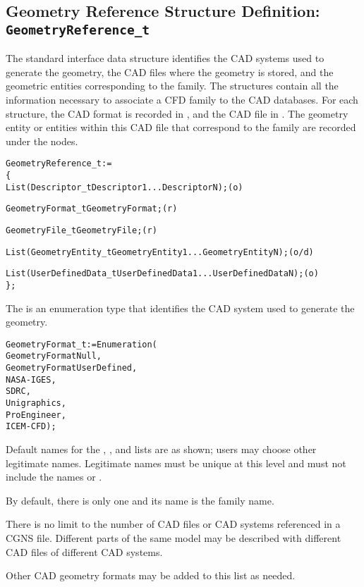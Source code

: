 \subsection{Geometry Reference Structure Definition: \texttt{GeometryReference\_t}}
\label{s:GeometryReference}

The standard interface data structure identifies the CAD systems used
to generate the geometry, the CAD files where the geometry is stored,
and the geometric entities corresponding to the family.
The  structures contain all the information
necessary to associate a CFD family to the CAD databases.
For each  structure, the CAD format
is recorded in , and the CAD file in
.
The geometry entity or entities within this CAD file that correspond to
the family are recorded under the  nodes.

\begin{alltt}
  GeometryReference\_t :=
    \{
    List( Descriptor\_t Descriptor1 ... DescriptorN ) ;                      (o)

    GeometryFormat\_t GeometryFormat ;                                       (r)

    GeometryFile\_t GeometryFile ;                                           (r)

    List (GeometryEntity\_t GeometryEntity1 ... GeometryEntityN) ;           (o/d)

    List( UserDefinedData\_t UserDefinedData1 ... UserDefinedDataN ) ;       (o)
    \} ;
\end{alltt}

The  is an enumeration type that identifies the CAD
system used to generate the geometry.

\begin{alltt}
  GeometryFormat_t := Enumeration(
    GeometryFormatNull,
    GeometryFormatUserDefined,
    NASA-IGES,
    SDRC,
    Unigraphics,
    ProEngineer,
    ICEM-CFD ) ;
\end{alltt}

\begin{notes}
\item
Default names for the , , and
lists are as shown; users may choose other legitimate names.
Legitimate names must be unique at this level and must not include the
names  or .
\item
By default, there is only one  and its name is
the family name.
\item
There is no limit to the number of CAD files or CAD systems referenced
in a CGNS file.
Different parts of the same model may be described with different CAD
files of different CAD systems.
\item
Other CAD geometry formats may be added to this list as needed.
\end{notes}

